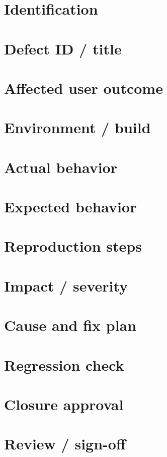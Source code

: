 \documentclass[11pt,letterpaper]{article}
\begin{document}
\section{Identification}
\section{Defect ID / title}
\section{Affected user outcome}
\section{Environment / build}
\section{Actual behavior}
\section{Expected behavior}
\clearpage
\section{Reproduction steps}
\section{Impact / severity}
\section{Cause and fix plan}
\section{Regression check}
\clearpage
\section{Closure approval}
\section{Review / sign-off}
\end{document}
